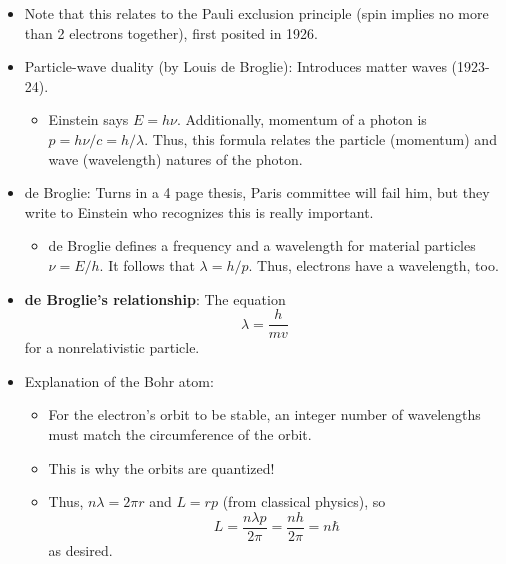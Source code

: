 \documentclass[../notes.tex]{subfiles}
\begin{document}
\begin{itemize}
    \item Note that this relates to the Pauli exclusion principle (spin implies no more than 2 electrons together), first posited in 1926.
    \item Particle-wave duality (by Louis de Broglie): Introduces matter waves (1923-24).
    \begin{itemize}
        \item Einstein says $E=h\nu$. Additionally, momentum of a photon is $p=h\nu/c=h/\lambda$. Thus, this formula relates the particle (momentum) and wave (wavelength) natures of the photon.
    \end{itemize}
    \item de Broglie: Turns in a 4 page thesis, Paris committee will fail him, but they write to Einstein who recognizes this is really important.
    \begin{itemize}
        \item de Broglie defines a frequency and a wavelength for material particles $\nu=E/h$. It follows that $\lambda=h/p$. Thus, electrons have a wavelength, too.
    \end{itemize}
    \item \textbf{de Broglie's relationship}: The equation
    \begin{equation*}
        \lambda = \frac{h}{mv}
    \end{equation*}
    for a nonrelativistic particle.
    \item Explanation of the Bohr atom:
    \begin{itemize}
        \item For the electron's orbit to be stable, an integer number of wavelengths must match the circumference of the orbit.
        \item This is why the orbits are quantized!
        \item Thus, $n\lambda=2\pi r$ and $L=rp$ (from classical physics), so
        \begin{equation*}
            L = \frac{n\lambda p}{2\pi} = \frac{nh}{2\pi} = n\hbar
        \end{equation*}
        as desired.
    \end{itemize}
\end{itemize}
\end{document}
